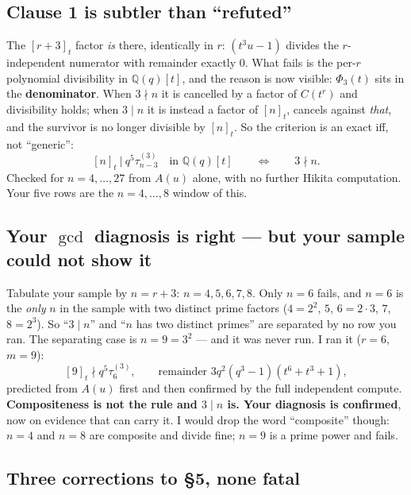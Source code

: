 \documentclass[11pt]{article}
\begin{document}
\subsection*{Clause 1 is subtler than ``refuted''}

The $[r+3]_t$ factor \emph{is} there, identically in $r$: $(t^3u-1)$ divides the
$r$-independent numerator with remainder exactly $0$. What fails is the per-$r$
polynomial divisibility in $\mathbb{Q}(q)[t]$, and the reason is now visible:
$\Phi_3(t)$ sits in the \textbf{denominator}. When $3\nmid n$ it is cancelled by a
factor of $C(t^r)$ and divisibility holds; when $3\mid n$ it is instead a factor of
$[n]_t$, cancels against \emph{that}, and the survivor is no longer divisible by
$[n]_t$. So the criterion is an exact iff, not ``generic'':
\[
[n]_t \ \Big|\ q^5\tau^{(3)}_{n-3} \quad\text{in } \mathbb{Q}(q)[t]
\qquad\Longleftrightarrow\qquad 3\nmid n .
\]
Checked for $n=4,\dots,27$ from $A(u)$ alone, with no further Hikita computation. Your
five rows are the $n=4,\dots,8$ window of this.

\subsection*{Your $\gcd$ diagnosis is right --- but your sample could not show it}

Tabulate your sample by $n=r+3$: $n=4,5,6,7,8$. Only $n=6$ fails, and $n=6$ is the
\emph{only} $n$ in the sample with two distinct prime factors ($4=2^2$, $5$, $6=2\cdot3$,
$7$, $8=2^3$). So ``$3\mid n$'' and ``$n$ has two distinct primes'' are separated by no
row you ran. The separating case is $n=9=3^2$ --- and it was never run. I ran it
($r=6$, $m=9$):
\[
[9]_t \nmid q^5\tau^{(3)}_6, \qquad \text{remainder } 3q^2(q^3-1)(t^6+t^3+1),
\]
predicted from $A(u)$ first and then confirmed by the full independent compute.
\textbf{Compositeness is not the rule and $3\mid n$ is. Your diagnosis is confirmed},
now on evidence that can carry it. I would drop the word ``composite'' though: $n=4$
and $n=8$ are composite and divide fine; $n=9$ is a prime power and fails.

\subsection*{Three corrections to \S5, none fatal}
\end{document}
